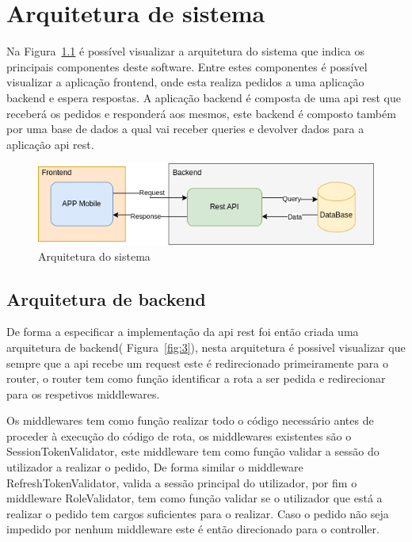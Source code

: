 \chapter{Arquitetura de sistema}
Na Figura~\ref{fig:2} é possível visualizar a arquitetura do sistema que indica os principais componentes deste software. Entre estes componentes é possível visualizar a aplicação frontend, onde esta realiza pedidos a uma aplicação backend e espera respostas. A aplicação backend é composta de uma api rest que receberá os pedidos e responderá aos mesmos, este backend é composto também por uma base de dados a qual vai receber queries e devolver dados para a aplicação api rest.

\begin{figure}[htb]
    \centering
    
    \includegraphics[width=\textwidth]{images/Arquiteturas/arquitetura_de_solucao.png}
    \caption{Arquitetura do sistema}
    \label{fig:2}
\end{figure}

\newpage

\section{Arquitetura de backend}

De forma a especificar a implementação da api rest foi então criada uma arquitetura de backend( Figura~\ref{fig:3}), nesta arquitetura é possivel visualizar que sempre que a api recebe um request este é redirecionado primeiramente para o router, o router tem como função identificar a rota a ser pedida e redirecionar para os respetivos middlewares. 

Os middlewares tem como função realizar todo o código necessário antes de proceder à execução do código de rota, os middlewares existentes são o SessionTokenValidator, este middleware tem como função validar a sessão do utilizador a realizar o pedido, De forma similar o middleware RefreshTokenValidator, valida a sessão principal do utilizador, por fim o middleware RoleValidator, tem como função validar se o utilizador que está a realizar o pedido tem cargos suficientes para o realizar. Caso o pedido não seja impedido por nenhum middleware este é então direcionado para o controller.

